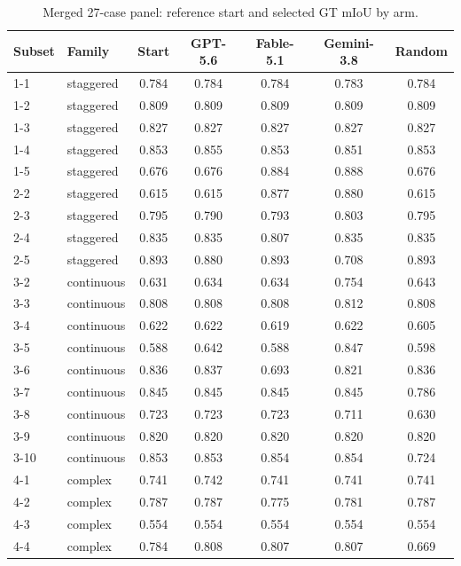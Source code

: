 \documentclass[a4paper,fleqn]{cas-dc}
\begin{document}
\begin{table}[t]
\caption{Merged 27-case panel: reference start and selected GT mIoU by arm.}\label{tab:panel-audit}
{\footnotesize
\begin{tabular*}{\textwidth}{@{\extracolsep{\fill}} l l c cccc @{}}
\toprule
Subset & Family & Start & GPT-5.6 & Fable-5.1 & Gemini-3.8 & Random \\
\midrule
1-1 & staggered & 0.784 & 0.784 & 0.784 & 0.783 & 0.784 \\
1-2 & staggered & 0.809 & 0.809 & 0.809 & 0.809 & 0.809 \\
1-3 & staggered & 0.827 & 0.827 & 0.827 & 0.827 & 0.827 \\
\rowcolor{yellow!25}1-4 & staggered & 0.853 & 0.855 & 0.853 & 0.851 & 0.853 \\
1-5 & staggered & 0.676 & 0.676 & 0.884 & 0.888 & 0.676 \\
2-2 & staggered & 0.615 & 0.615 & 0.877 & 0.880 & 0.615 \\
\rowcolor{yellow!25}2-3 & staggered & 0.795 & 0.790 & 0.793 & 0.803 & 0.795 \\
2-4 & staggered & 0.835 & 0.835 & 0.807 & 0.835 & 0.835 \\
2-5 & staggered & 0.893 & 0.880 & 0.893 & 0.708 & 0.893 \\
3-2 & continuous & 0.631 & 0.634 & 0.634 & 0.754 & 0.643 \\
\rowcolor{yellow!25}3-3 & continuous & 0.808 & 0.808 & 0.808 & 0.812 & 0.808 \\
3-4 & continuous & 0.622 & 0.622 & 0.619 & 0.622 & 0.605 \\
3-5 & continuous & 0.588 & 0.642 & 0.588 & 0.847 & 0.598 \\
3-6 & continuous & 0.836 & 0.837 & 0.693 & 0.821 & 0.836 \\
3-7 & continuous & 0.845 & 0.845 & 0.845 & 0.845 & 0.786 \\
3-8 & continuous & 0.723 & 0.723 & 0.723 & 0.711 & 0.630 \\
3-9 & continuous & 0.820 & 0.820 & 0.820 & 0.820 & 0.820 \\
\rowcolor{yellow!25}3-10 & continuous & 0.853 & 0.853 & 0.854 & 0.854 & 0.724 \\
\rowcolor{yellow!25}4-1 & complex & 0.741 & 0.742 & 0.741 & 0.741 & 0.741 \\
4-2 & complex & 0.787 & 0.787 & 0.775 & 0.781 & 0.787 \\
4-3 & complex & 0.554 & 0.554 & 0.554 & 0.554 & 0.554 \\
4-4 & complex & 0.784 & 0.808 & 0.807 & 0.807 & 0.669 \\

\end{tabular*}}
\end{table}
\end{document}
